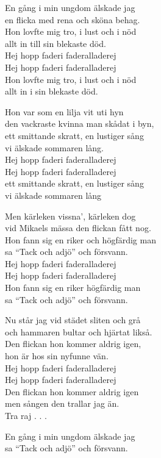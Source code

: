 \vspace{10pt}
En gång i min ungdom älskade jag\\
en flicka med rena och sköna behag.\\
Hon lovfte mig tro, i lust och i nöd\\
allt in till sin blekaste död.\\
Hej hopp faderi faderalladerej\\
Hej hopp faderi faderalladerej\\
Hon lovfte mig tro, i lust och i nöd\\
allt in i sin blekaste död.\par
\vspace{10pt}
Hon var som en lilja vit uti hyn\\
den vackraste kvinna man skådat i byn,\\
ett smittande skratt, en lustiger sång\\
vi älskade sommaren lång.\\
Hej hopp faderi faderalladerej\\
Hej hopp faderi faderalladerej\\
ett smittande skratt, en lustiger sång\\
vi älskade sommaren lång\par
\vspace{10pt}
Men kärleken vissna', kärleken dog\\
vid Mikaels mässa den flickan fått nog.\\
Hon fann sig en riker och högfärdig man\\
sa ``Tack och adjö'' och försvann.\\
Hej hopp faderi faderalladerej\\
Hej hopp faderi faderalladerej\\
Hon fann sig en riker högfärdig man\\
sa ``Tack och adjö'' och försvann.\par
\newpage
Nu står jag vid städet sliten och grå\\
och hammaren bultar och hjärtat likså.\\
Den flickan hon kommer aldrig igen,\\
hon är hos sin nyfunne vän.\\
Hej hopp faderi faderalladerej\\
Hej hopp faderi faderalladerej\\
Den flickan hon kommer aldrig igen\\
men sången den trallar jag än.\\
Tra raj . . .\par
\vspace{15pt}
\vspace{10pt}
En gång i min ungdom älskade jag\\
sa ``Tack och adjö'' och försvann.
